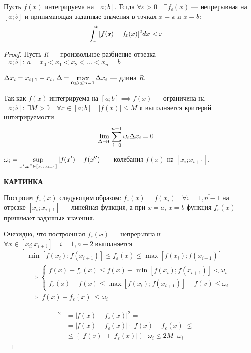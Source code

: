 \begin{theorem}
    Пусть $f(x)$ интегрируема на $[a; b]$. Тогда $\forall \varepsilon > 0 \quad
    \exists f_\varepsilon(x)$ --- непрерывная на $[a; b]$ и принимающая 
    заданные значения в точках $x = a$ и $x = b$:
    \[ \displaystyle\int_a^b [f(x) - f_\varepsilon(x)]^2 dx < \varepsilon \]
\end{theorem}
\begin{proof}
    Пусть $R$ --- произвольное разбиение отрезка $[a; b]: \:
    a = x_0 < x_1 < x_2 < \dots < x_n = b$

    $\Delta x_i = x_{i + 1} - x_i, \, \Delta = \displaystyle\max_{0 \leq i \leq n - 1}
    \Delta x_i$ --- длина $R$.

    Так как $f(x)$ интегрируема на $[a; b] \implies f(x)$ --- ограничена на
    $[a; b]: \: \exists M > 0 \quad \forall x \in [a; b] \quad |f(x)| \leq M$
    и выполняется критерий интегрируемости 
    \[ \displaystyle\lim_{\Delta \to 0} \displaystyle\sum_{i = 0}^{n - 1} \omega_i \Delta x_i = 0 \]

    $\omega_i = \displaystyle\sup_{x', x'' \in [x_i; x_{i + 1}]} |f(x') - f(x'')|$ ---
    колебания $f(x)$ на $[x_i; x_{i + 1}]$.

    \textbf{КАРТИНКА}

    Построим $f_\varepsilon(x)$ следующим образом: $f_\varepsilon(x) = f(x_i)
    \quad \forall i = \overline{1, n - 1}$ на отрезке $[x_i; x_{i + 1}]$ ---
    линейная функция, а при $x = a, \, x = b$ функция $f_\varepsilon(x)$
    принимает заданные значения.

    Очевидно, что построенная $f_\varepsilon(x)$ --- непрерывна и
    $\forall x \in [x_i; x_{i + 1}] \quad i = \overline{1, n - 2}$ выполняется
    \begin{align*}
        &\min [f(x_i); f(x_{i + 1})] \leq 
        f_\varepsilon(x) \leq \max [f(x_i); f(x_{i + 1})] \\
        &\implies \begin{cases}
            f(x) - f_\varepsilon(x) \leq f(x) - \min [f(x_i); f(x_{i + 1})] < \omega_i \\
            f_\varepsilon(x) - f(x) \leq \max [f(x_i); f(x_{i + 1})] - f(x) \leq \omega_i
        \end{cases} \\
        &\implies |f(x) - f_\varepsilon(x)| \leq \omega_i
    \end{align*} 

    \begin{align*}
        [f(x) - f_\varepsilon(x)]^2 &= |f(x) - f_\varepsilon(x)|^2 = \\
        &= |f(x) - f_\varepsilon(x)| \cdot |f(x) - f_\varepsilon(x)| \leq \\ 
        &\leq (|f(x)| + |f_\varepsilon(x)|) \cdot \omega_i \leq 2 M \cdot \omega_i
    \end{align*}


\end{proof}
